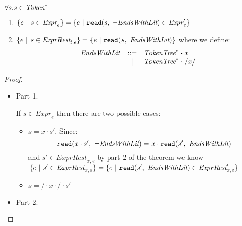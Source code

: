 \documentclass[preprint,10pt]{sigplanconf}
\begin{document}
\begin{theorem}\mbox{}

\(\forall s. s \in \textit{Token}^{*} \)
\begin{enumerate}
\item \( 
  \{ e ~|~ s \in \textit{Expr}_{e} \} 
  =  
  \{ e ~|~ \texttt{read}(s,~\neg \textit{EndsWithLit}) \in \textit{Expr}'_{e}
  \}
  \)
\item \( 
  \{ e ~|~ s \in \textit{ExprRest}_{l, e} \}
  =
  \{ e ~|~ \texttt{read}(s,~\textit{EndsWithLit}) \}
  \)
  where we define:
  \[
  \begin{array}{rcl}
    \textit{EndsWithLit} &::=& \textit{TokenTree}^{*}\cdot x
    \\
    &|& \textit{TokenTree}^{*} \cdot /x/ 
  \end{array}
  \]
\end{enumerate}
\end{theorem}
\begin{proof}\mbox{}
  
  \begin{itemize}
  \item Part 1.

    If \( s \in \textit{Expr}_{e} \) then there are two possible cases:
    \begin{itemize}
    \item \( s = x \cdot s' \). Since:
      \[
      \texttt{read}(x \cdot s',~\neg \textit{EndsWithLit}) 
      =
      x \cdot \texttt{read}(s',~\textit{EndsWithLit})
      \]
      and \( s' \in \textit{ExprRest}_{x, e} \) by part 2 of the theorem
      we know
      \(
      \{ e ~|~ s' \in \textit{ExprRest}_{x, e} \}
      =
      \{ e ~|~ \texttt{read}(s',~\textit{EndsWithLit}) \in \textit{ExprRest}_{x, e}' \}
      \)
    \item \( s = / \cdot x \cdot / \cdot s' \)
    \end{itemize}
    
  \item Part 2.
  \end{itemize}
  

\end{proof}
\end{document}
